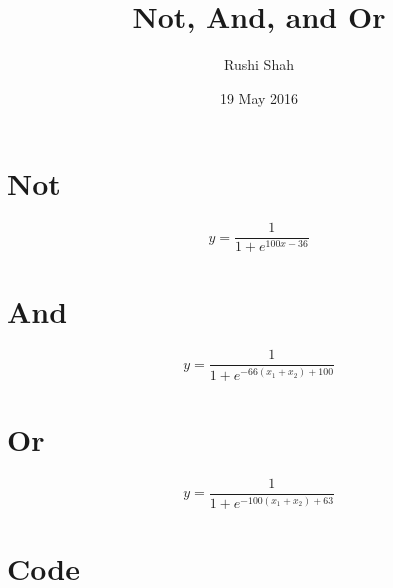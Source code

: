 \documentclass{article}
\author{Rushi Shah}
\date{19 May 2016}
\title{Not, And, and Or}
\begin{document}
\maketitle 

\section{Not}   

\[
y = \frac{1}{1 + e^{100x - 36}}
\]

\section{And}

\[
y = \frac{1}{1 + e^{-66(x_1 + x_2) + 100}}
\]

\section{Or}

\[
y = \frac{1}{1 + e^{-100(x_1 + x_2) + 63}}
\]

\section{Code}


\inputminted{python}{script.py}





\end{document}
